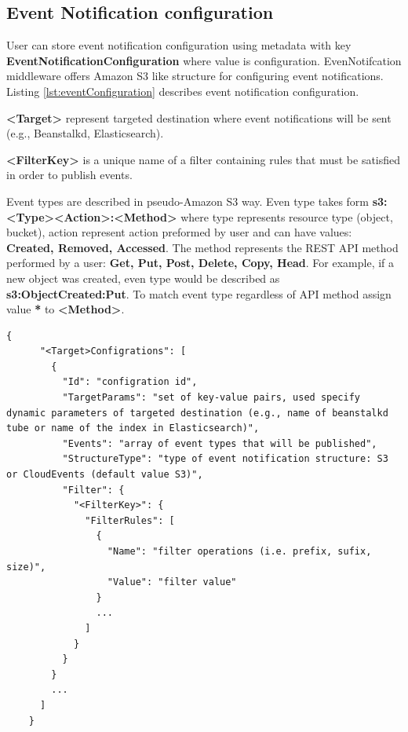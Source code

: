     \subsection{Event Notification configuration}
    User can store event notification configuration using metadata with key \textbf{EventNotificationConfiguration} where value is configuration.
    EvenNotifcation middleware offers Amazon S3 like structure for configuring event notifications.
    Listing \ref{lst:eventConfiguration} describes event notification configuration.

    \textbf{<Target>} represent targeted destination where event notifications will be sent (e.g., Beanstalkd, Elasticsearch).

    \textbf{<FilterKey>} is a unique name of a filter containing rules that must be satisfied in order to publish events.

    Event types are described in pseudo-Amazon S3 way. Even type takes form \textbf{s3:<Type><Action>:<Method>} where type represents resource type (object, bucket), action represent action preformed by user and can have values: \textbf{Created, Removed, Accessed}. The method represents the REST API method performed by a user: \textbf{Get, Put, Post, Delete, Copy, Head}. For example, if a new object was created, even type would be described as \textbf{s3:ObjectCreated:Put}. To match event type regardless of API method assign value \textbf{*} to \textbf{<Method>}.

    \begin{lstlisting}[style=jsonStyle, caption=Strucute of event notification configuration,    label=lst:eventConfiguration]
    {
      "<Target>Configrations": [
        {
          "Id": "configration id",
          "TargetParams": "set of key-value pairs, used specify dynamic parameters of targeted destination (e.g., name of beanstalkd tube or name of the index in Elasticsearch)",
          "Events": "array of event types that will be published",
          "StructureType": "type of event notification structure: S3 or CloudEvents (default value S3)",
          "Filter": {
            "<FilterKey>": {
              "FilterRules": [
                {
                  "Name": "filter operations (i.e. prefix, sufix, size)",
                  "Value": "filter value"
                }
                ...
              ]
            }
          }
        }
        ...
      ]
    }
    \end{lstlisting}


